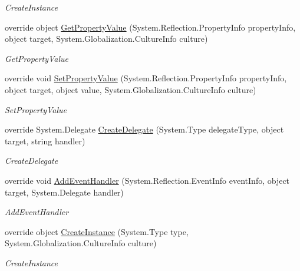 \begin{DoxyCompactItemize}
\begin{DoxyCompactList}\small\item\em Create\+Instance \end{DoxyCompactList}\item 
override object \mbox{\hyperlink{class_xaml_generated_namespace_1_1_generated_internal_type_helper_afdc9fe15b56607d02082908d934480c6}{Get\+Property\+Value}} (System.\+Reflection.\+Property\+Info property\+Info, object target, System.\+Globalization.\+Culture\+Info culture)
\begin{DoxyCompactList}\small\item\em Get\+Property\+Value \end{DoxyCompactList}\item 
override void \mbox{\hyperlink{class_xaml_generated_namespace_1_1_generated_internal_type_helper_ade0f04c0f7b18dd5b170e071d5534d38}{Set\+Property\+Value}} (System.\+Reflection.\+Property\+Info property\+Info, object target, object value, System.\+Globalization.\+Culture\+Info culture)
\begin{DoxyCompactList}\small\item\em Set\+Property\+Value \end{DoxyCompactList}\item 
override System.\+Delegate \mbox{\hyperlink{class_xaml_generated_namespace_1_1_generated_internal_type_helper_a8ec4c37e82d9f4e867e9655f4eac3a78}{Create\+Delegate}} (System.\+Type delegate\+Type, object target, string handler)
\begin{DoxyCompactList}\small\item\em Create\+Delegate \end{DoxyCompactList}\item 
override void \mbox{\hyperlink{class_xaml_generated_namespace_1_1_generated_internal_type_helper_a73471f4a6d1ca4c4fceec9ad8610f0c8}{Add\+Event\+Handler}} (System.\+Reflection.\+Event\+Info event\+Info, object target, System.\+Delegate handler)
\begin{DoxyCompactList}\small\item\em Add\+Event\+Handler \end{DoxyCompactList}\item 
override object \mbox{\hyperlink{class_xaml_generated_namespace_1_1_generated_internal_type_helper_aefb7a98fceb9c287cef4756942f441d1}{Create\+Instance}} (System.\+Type type, System.\+Globalization.\+Culture\+Info culture)
\begin{DoxyCompactList}\small\item\em Create\+Instance \end{DoxyCompactList}\item 

\end{DoxyCompactItemize}
